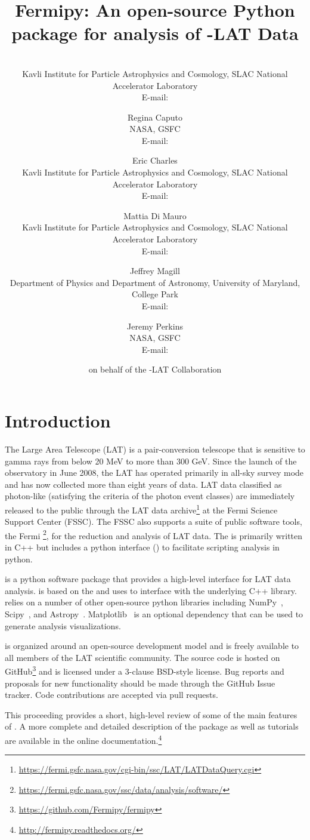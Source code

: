\documentclass{PoS}
\title{Fermipy: An open-source Python package for analysis of \Fermi-LAT Data}
\author{\speaker{Matthew Wood}\\
  Kavli Institute for Particle Astrophysics and Cosmology, SLAC National Accelerator Laboratory\\
  E-mail: \email{mdwood@slac.stanford.edu}}
\author{Regina Caputo\\
  NASA, GSFC\\
  E-mail: \email{regina.caputo@nasa.gov}}
\author{Eric Charles\\
  Kavli Institute for Particle Astrophysics and Cosmology, SLAC National Accelerator Laboratory\\
  E-mail: \email{echarles@slac.stanford.edu}}
\author{Mattia Di Mauro\\
  Kavli Institute for Particle Astrophysics and Cosmology, SLAC National Accelerator Laboratory\\
  E-mail: \email{mdimauro@slac.stanford.edu}}
\author{Jeffrey Magill\\
  Department of Physics and Department of Astronomy, University of Maryland, College Park\\
  E-mail: \email{jmagill@umd.edu}}
\author{Jeremy Perkins\\
  NASA, GSFC\\
  E-mail: \email{jeremy.s.perkins@nasa.gov}}
\author{on behalf of the \Fermi-LAT Collaboration}
\newcommand{\url}[1]{\href{#1}{#1}}
\begin{document}
\section{Introduction}

The {\Fermi} Large Area Telescope (LAT) is a pair-conversion telescope
that is sensitive to gamma rays from below 20 MeV to more than 300
GeV.  Since the launch of the {\Fermi} observatory in June 2008, the
LAT has operated primarily in all-sky survey mode and has now
collected more than eight years of data.
LAT data classified as photon-like (satisfying the criteria of the
photon event classes) are immediately released to the public
through the LAT data
archive\footnote{\url{https://fermi.gsfc.nasa.gov/cgi-bin/ssc/LAT/LATDataQuery.cgi}}
at the Fermi Science Support Center (FSSC).  The FSSC also supports a
suite of public software tools, the Fermi {\stools}
\footnote{\url{https://fermi.gsfc.nasa.gov/ssc/data/analysis/software/}},
for the reduction and analysis of LAT data.  The {\stools} is
primarily written in C++ but includes a python interface ({\pylike}) to
facilitate scripting analysis in python.



{\fermipy} is a python software package that provides a high-level
interface for LAT data analysis.  {\fermipy} is based on the {\stools}
and uses {\pylike} to interface with the underlying C++ library.
{\fermipy} relies on a number of other open-source python libraries
including NumPy~\cite{oliphant_guide_2006},
Scipy~\cite{scipy}, and
Astropy~\cite{2013A&A...558A..33A}.
Matplotlib~\cite{Hunter:2007:MGE:1251563.1251845} is an optional
dependency that can be used to generate analysis visualizations.

{\fermipy} is organized around an open-source development model and is
freely available to all members of the LAT scientific community.  The
{\fermipy} source code is hosted on
GitHub\footnote{\url{https://github.com/Fermipy/fermipy}} and is
licensed under a 3-clause BSD-style license.  Bug reports and
proposals for new functionality should be made through the GitHub
Issue tracker.  Code contributions are accepted via pull requests.


This proceeding provides a short, high-level review of some of the
main features of {\fermipy}.  A more complete and detailed description
of the package as well as tutorials are available in the online
documentation.\footnote{\url{http://fermipy.readthedocs.org/}}
\end{document}
